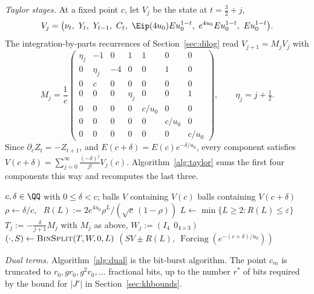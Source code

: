 \emph{Taylor stages.} At a fixed point $c$, let $V_j$ be the state at $t = \frac32 + j$,
\[
  V_j = \bigl(\nu_t,\ Y_t,\ Y_{t-1},\ C_t,\ \Eip(4u_0)Eu_0^{1-t},\ e^{4u_0}Eu_0^{1-t},\ Eu_0^{1-t}\bigr).
\]
The integration-by-parts recurrences of Section~\ref{sec:dilog} read $V_{j+1} = M_jV_j$ with
\[
  M_j = \frac1c\begin{pmatrix}
  \eta_j & -1 & 0 & 1 & 1 & 0 & 0 \\
  0 & \eta_j & -4 & 0 & 0 & 1 & 0 \\
  0 & c & 0 & 0 & 0 & 0 & 0 \\
  0 & 0 & 0 & \eta_j & 0 & 0 & 1 \\
  0 & 0 & 0 & 0 & c/u_0 & 0 & 0 \\
  0 & 0 & 0 & 0 & 0 & c/u_0 & 0 \\
  0 & 0 & 0 & 0 & 0 & 0 & c/u_0
  \end{pmatrix}, \qquad \eta_j = j + \tfrac12.
\]
Since $\partial_cZ_t = -Z_{t+1}$, and $E(c+\delta) = E(c)e^{-\delta/u_0}$, every component satisfies
$V(c+\delta) = \sum_{j=0}^{\infty}\frac{(-\delta)^j}{j!}V_j(c)$. Algorithm~\ref{alg:taylor} sums the first four
components this way and recomputes the last three.

\begin{algorithm}[ht]
\caption{$\textsc{TaylorStage}(c, \delta, V)$}\label{alg:taylor}
\begin{algorithmic}[1]
\small
\Require $c, \delta \in \QQ$ with $0 \le \delta < c$; balls $V$ containing $V(c)$
\Ensure balls containing $V(c+\delta)$
\State $\rho \gets \delta/c$, \ $R(L) := 2e^{4u_0}\rho^L/(\sqrt c\,(1-\rho))$
\State $L \gets \min\{L \ge 2 : R(L) \le \varepsilon\}$
\State $T_j := -\frac{\delta}{j+1}M_j$ with $M_j$ as above, \quad $W_j := (I_4\ \ 0_{4\times3})$
\State $(\cdot, S) \gets \textsc{BinSplit}(T, W, 0, L)$
\State \Return $(SV \pm R(L),\ \operatorname{Forcing}(e^{-(c+\delta)/u_0}))$
\end{algorithmic}
\end{algorithm}

\emph{Dual terms.} Algorithm~\ref{alg:dual} is the bit-burst algorithm. The point $c_m$ is truncated to
$r_0, gr_0, g^2r_0, \dots$ fractional bits, up to the number $r^*$ of bits required by the bound for $|J'|$ in
Section~\ref{sec:khbounds}.


